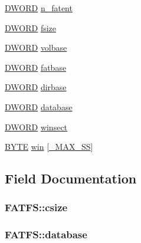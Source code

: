 \begin{DoxyCompactItemize}
\item 
\hyperlink{integer_8h_ad342ac907eb044443153a22f964bf0af}{D\+W\+O\+RD} \hyperlink{structFATFS_a8da50eeba6469bc20d60ca0cf9a1307c}{n\+\_\+fatent}
\item 
\hyperlink{integer_8h_ad342ac907eb044443153a22f964bf0af}{D\+W\+O\+RD} \hyperlink{structFATFS_a53e9560659f14e66f306c2c444198bf3}{fsize}
\item 
\hyperlink{integer_8h_ad342ac907eb044443153a22f964bf0af}{D\+W\+O\+RD} \hyperlink{structFATFS_a8f0ca578755749d204f59dc83f1a7649}{volbase}
\item 
\hyperlink{integer_8h_ad342ac907eb044443153a22f964bf0af}{D\+W\+O\+RD} \hyperlink{structFATFS_a848fba02c4aabe02ef2984e578f33d64}{fatbase}
\item 
\hyperlink{integer_8h_ad342ac907eb044443153a22f964bf0af}{D\+W\+O\+RD} \hyperlink{structFATFS_a3f72fd998dbcce4652a85a81fe944bc4}{dirbase}
\item 
\hyperlink{integer_8h_ad342ac907eb044443153a22f964bf0af}{D\+W\+O\+RD} \hyperlink{structFATFS_a5b6c0bc2e9fd2ae8ef714210a74a2d5d}{database}
\item 
\hyperlink{integer_8h_ad342ac907eb044443153a22f964bf0af}{D\+W\+O\+RD} \hyperlink{structFATFS_ac60e69c00e6bf7c25febfbac4dc1476b}{winsect}
\item 
\hyperlink{integer_8h_a4ae1dab0fb4b072a66584546209e7d58}{B\+Y\+TE} \hyperlink{structFATFS_a7cc35a593465e727ab87723c14610644}{win} \mbox{[}\hyperlink{ffconf_8h_ac271b697378912f17132cb9c7d0de024}{\+\_\+\+M\+A\+X\+\_\+\+SS}\mbox{]}
\end{DoxyCompactItemize}


\subsection{Field Documentation}
\subsubsection[{\texorpdfstring{csize}{csize}}]{ F\+A\+T\+F\+S\+::csize}\hypertarget{structFATFS_a504a1175f6dcc9a854b9da94463bd108}{}\label{structFATFS_a504a1175f6dcc9a854b9da94463bd108}
\subsubsection[{\texorpdfstring{database}{database}}]{ F\+A\+T\+F\+S\+::database}\hypertarget{structFATFS_a5b6c0bc2e9fd2ae8ef714210a74a2d5d}{}\label{structFATFS_a5b6c0bc2e9fd2ae8ef714210a74a2d5d}
